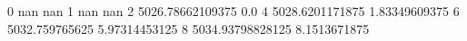 0 nan nan
1 nan nan
2 5026.78662109375 0.0
4 5028.6201171875 1.83349609375
6 5032.759765625 5.97314453125
8 5034.93798828125 8.1513671875
